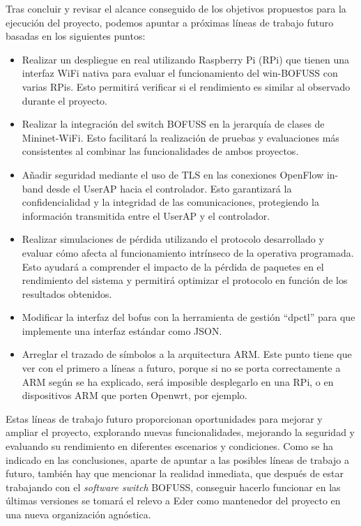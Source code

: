 Tras concluir y revisar el alcance conseguido de los objetivos propuestos para la ejecución del proyecto, podemos apuntar a próximas líneas de trabajo futuro basadas en los siguientes puntos:
\begin{itemize}
    \item Realizar un despliegue en real utilizando Raspberry Pi (RPi) que tienen una interfaz WiFi nativa para evaluar el funcionamiento del win-BOFUSS con varias RPis. Esto permitirá verificar si el rendimiento es similar al observado durante el proyecto.

    \item Realizar la integración del switch BOFUSS en la jerarquía de clases de Mininet-WiFi. Esto facilitará la realización de pruebas y evaluaciones más consistentes al combinar las funcionalidades de ambos proyectos.

    \item Añadir seguridad mediante el uso de TLS en las conexiones OpenFlow in-band desde el UserAP hacia el controlador. Esto garantizará la confidencialidad y la integridad de las comunicaciones, protegiendo la información transmitida entre el UserAP y el controlador.

    \item Realizar simulaciones de pérdida utilizando el protocolo desarrollado y evaluar cómo afecta al funcionamiento intrínseco de la operativa programada. Esto ayudará a comprender el impacto de la pérdida de paquetes en el rendimiento del sistema y permitirá optimizar el protocolo en función de los resultados obtenidos.

    \item Modificar la interfaz del \gls{bofus} con la herramienta de gestión ``dpctl'' para que implemente una interfaz estándar como JSON.

    \item Arreglar el trazado de símbolos a la arquitectura ARM. Este punto tiene que ver con el primero a líneas a futuro, porque si no se porta correctamente a ARM según se ha explicado, será imposible desplegarlo en una RPi, o en dispositivos ARM que porten Openwrt, por ejemplo.
\end{itemize}

Estas líneas de trabajo futuro proporcionan oportunidades para mejorar y ampliar el proyecto, explorando nuevas funcionalidades, mejorando la seguridad y evaluando su rendimiento en diferentes escenarios y condiciones. Como se ha indicado en las conclusiones, aparte de apuntar a las posibles líneas de trabajo a futuro, también hay que mencionar la realidad inmediata, que después de estar trabajando con el \textit{software switch} BOFUSS, conseguir hacerlo funcionar en las últimas versiones se tomará el relevo a Eder como mantenedor del proyecto en una nueva organización agnóstica.



